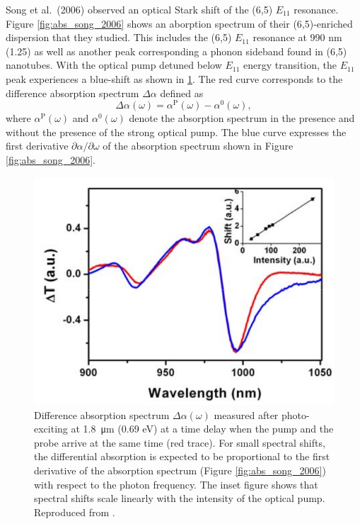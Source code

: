 Song et al.\ (2006) observed an optical Stark shift of the (6,5) $E_{11}$ resonance. Figure \ref{fig:abs_song_2006} shows an aborption spectrum of their (6,5)-enriched dispersion that they studied. This includes the (6,5) $E_{11}$ resonance at 990 nm (1.25) as well as another peak corresponding a phonon sideband found in (6,5) nanotubes. With the optical pump detuned below $E_{11}$ energy transition, the $E_{11}$ peak experiences a blue-shift as shown in \ref{fig:dtt_song_2006}. The red curve corresponds to the difference absorption spectrum $\Delta \alpha$ defined as
\begin{equation}
	\Delta\alpha(\omega) = \alpha^\text{P}(\omega) - \alpha^0(\omega),
\end{equation}
where $\alpha^\text{P}(\omega)$ and $\alpha^\text{0}(\omega)$ denote the absorption spectrum in the presence and without the presence of the strong optical pump. The blue curve expresses  the first derivative $\partial\alpha / \partial\omega$ of the absorption spectrum shown in Figure \ref{fig:abs_song_2006}.

\begin{figure}[ht]
	\centering
	\includegraphics[scale=0.4]{images/chapter_prior_works/dtt_song_2006}
	\caption{Difference absorption spectrum $\Delta \alpha(\omega)$ measured after photo-exciting at \SI{1.8}{\um} (0.69 eV) at a time delay when the pump and the probe arrive at the same time (red trace). For small spectral shifts, the differential absorption is expected to be proportional to the first derivative of the absorption spectrum (Figure \ref{fig:abs_song_2006}) with respect to the photon frequency. The inset figure shows that spectral shifts scale linearly with the intensity of the optical pump. Reproduced from \cite{song2006optical}.}
	\label{fig:dtt_song_2006}
\end{figure}

